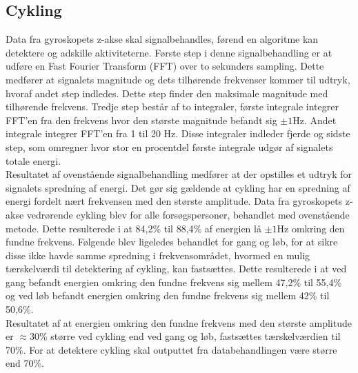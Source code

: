 \subsection{Cykling}
Data fra gyroskopets z-akse skal signalbehandles, førend en algoritme kan detektere og adskille aktiviteterne. Første step i denne signalbehandling er at udføre en Fast Fourier Transform (FFT) over to sekunders sampling. Dette medfører at signalets magnitude og dets tilhørende frekvenser kommer til udtryk, hvoraf andet step indledes. Dette step finder den maksimale magnitude med tilhørende frekvens. Tredje step består af to integraler, første integrale integrer FFT'en fra den frekvens hvor den største magnitude befandt sig $\pm 1$Hz. Andet integrale integrer FFT'en fra 1 til 20 Hz. Disse integraler indleder fjerde og sidste step, som omregner hvor stor en procentdel første integrale udgør af signalets totale energi. \\
Resultatet af ovenstående signalbehandling medfører at der opstilles et udtryk for signalets spredning af energi. Det gør sig gældende at cykling har en spredning af energi fordelt nært frekvensen med den største amplitude. Data fra gyroskopets z-akse vedrørende cykling blev for alle forsøgspersoner, behandlet med ovenstående metode. Dette resulterede i at 84,2\% til 88,4\% af energien lå $\pm 1$Hz omkring den fundne frekvens. Følgende blev ligeledes behandlet for gang og løb, for at sikre disse ikke havde samme spredning i frekvensområdet, hvormed en mulig tærskelværdi til detektering af cykling, kan fastsættes.  Dette resulterede i at ved gang befandt energien omkring den fundne frekvens sig mellem 47,2\% til 55,4\% og ved løb befandt energien omkring den fundne frekvens sig mellem 42\% til 50,6\%. \\
Resultatet af at energien omkring den fundne frekvens med den største amplitude er $\approx$30\% større ved cykling end ved gang og løb, fastsættes tærskelværdien til 70\%. For at detektere cykling skal outputtet fra databehandlingen være større end 70\%.

